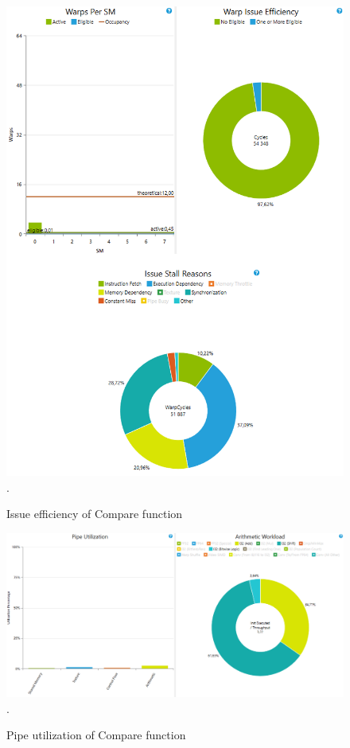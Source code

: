\documentclass[oneside,openright,12pt,final,en]{mgr}
\begin{document}
\begin{figure}[H]
	\centering
	\includegraphics[width=\textwidth]{compare_issue}.
	\caption{Issue efficiency of Compare function}
	\label{fig:compare_issue}
\end{figure}

\begin{figure}[H]
	\centering
	\includegraphics[width=\textwidth]{compare_pipe}.
	\caption{Pipe utilization of Compare function}
	\label{fig:compare_pipe}
\end{figure}
\end{document}
